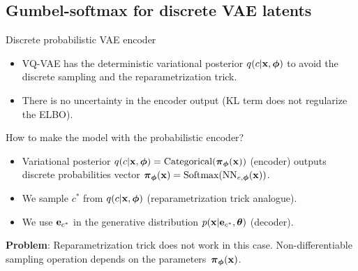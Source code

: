 \subsection{Gumbel-softmax for discrete VAE latents}
\begin{frame}{Discrete probabilistic VAE encoder}
	\begin{itemize}
		\item VQ-VAE has the deterministic variational posterior $q(c | \mathbf{x}, \boldsymbol{\phi})$ to avoid the discrete sampling and the reparametrization trick.
		\item There is no uncertainty in the encoder output (KL term does not regularize the ELBO). 
	\end{itemize}
	\begin{block}{How to make the model with the probabilistic encoder?}
		\begin{itemize}
			\item Variational posterior $q(c | \mathbf{x}, \boldsymbol{\phi}) = \text{Categorical}(\boldsymbol{\pi}_{\boldsymbol{\phi}}(\mathbf{x}))$ (encoder) outputs discrete probabilities vector $\boldsymbol{\pi}_{\boldsymbol{\phi}}(\mathbf{x}) = \text{Softmax}(\text{NN}_{e, \boldsymbol{\phi}}(\mathbf{x}))$.
			\item We sample $c^*$ from $q(c | \mathbf{x}, \boldsymbol{\phi})$ (reparametrization trick analogue).
			\item We use $\mathbf{e}_{c^*}$ in the generative distribution $p(\mathbf{x} | \mathbf{e}_{c^*}, \boldsymbol{\theta})$ (decoder).
		\end{itemize}
	\end{block}
	\textbf{Problem}: Reparametrization trick does not work in this case. Non-differentiable sampling operation depends on the parameters~$\boldsymbol{\pi}_{\boldsymbol{\phi}}(\mathbf{x})$.
\end{frame}
